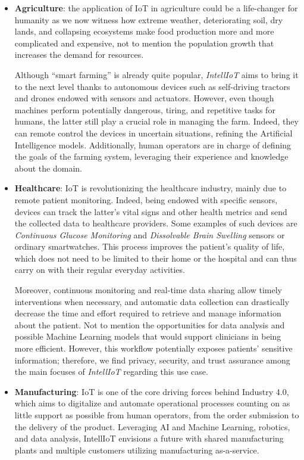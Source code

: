 \begin{itemize}
    \item \textbf{Agriculture}: the application of IoT in agriculture could be a life-changer for humanity as we now witness how extreme weather, deteriorating soil, dry lands, and collapsing ecosystems make food production more and more complicated and expensive, not to mention the population growth that increases the demand for resources.
    
    Although ``smart farming'' is already quite popular, \textit{IntellIoT} aims to bring it to the next level thanks to autonomous devices such as self-driving tractors and drones endowed with sensors and actuators.
    However, even though machines perform potentially dangerous, tiring, and repetitive tasks for humans, the latter still play a crucial role in managing the farm.
    Indeed, they can remote control the devices in uncertain situations, refining the Artificial Intelligence models.
    Additionally, human operators are in charge of defining the goals of the farming system, leveraging their experience and knowledge about the domain.
    \item \textbf{Healthcare}: IoT is revolutionizing the healthcare industry, mainly due to remote patient monitoring.
    Indeed, being endowed with specific sensors, devices can track the latter's vital signs and other health metrics and send the collected data to healthcare providers.
    Some examples of such devices are \textit{Continuous Glucose Monitoring} \cite{facchinetti2013real} and \textit{Dissolvable Brain Swelling}\cite{kang2016bioresorbable} sensors or ordinary smartwatches.
    This process improves the patient's quality of life, which does not need to be limited to their home or the hospital and can thus carry on with their regular everyday activities.

    Moreover, continuous monitoring and real-time data sharing allow timely interventions when necessary, and automatic data collection can drastically decrease the time and effort required to retrieve and manage information about the patient.
    Not to mention the opportunities for data analysis and possible Machine Learning models that would support clinicians in being more efficient.
    However, this workflow potentially exposes patients' sensitive information; therefore, we find privacy, security, and trust assurance among the main focuses of \textit{IntellIoT} regarding this use case.
    \item \textbf{Manufacturing}: IoT is one of the core driving forces behind Industry 4.0, which aims to digitalize and automate operational processes counting on as little support as possible from human operators, from the order submission to the delivery of the product.
    Leveraging AI and Machine Learning, robotics, and data analysis, IntellIoT envisions a future with shared manufacturing plants and multiple customers utilizing manufacturing as-a-service.


\end{itemize}
